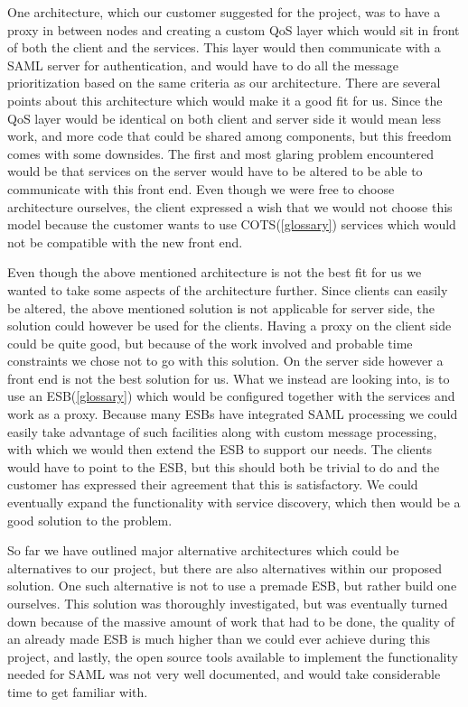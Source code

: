 \documentclass[12pt]{article}
\begin{document}
        One architecture, which our customer suggested for the project, was to have a proxy in between nodes and creating a custom QoS layer which would sit in front of both the client and the services. This layer would then communicate with a SAML server for authentication, and would have to do all the message prioritization based on the same criteria as our architecture. There are several points about this architecture which would make it a good fit for us. Since the QoS layer would be identical on both client and server side it would mean less work, and more code that could be shared among components, but this freedom comes with some downsides. The first and most glaring problem encountered would be that services on the server would have to be altered to be able to communicate with this front end. Even though we were free to choose architecture ourselves, the client expressed a wish that we would not choose this model because the customer wants to use COTS(\ref{glossary}) services which would not be compatible with the new front end.

        Even though the above mentioned architecture is not the best fit for us we wanted to take some aspects of the architecture further. Since clients can easily be altered, the above mentioned solution is not applicable for server side, the solution could however be used for the clients. Having a proxy on the client side could be quite good, but because of the work involved and probable time constraints we chose not to go with this solution. On the server side however a front end is not the best solution for us. What we instead are looking into, is to use an ESB(\ref{glossary}) which would be configured together with the services and work as a proxy. Because many ESBs have integrated SAML processing we could easily take advantage of such facilities along with custom message processing, with which we would then extend the ESB to support our needs. The clients would have to point to the ESB, but this should both be trivial to do and the customer has expressed their agreement that this is satisfactory. We could eventually expand the functionality with service discovery, which then would be a good solution to the problem.

        So far we have outlined major alternative architectures which could be alternatives to our project, but there are also alternatives within our proposed solution. One such alternative is not to use a premade ESB, but rather build one ourselves. This solution was thoroughly investigated, but was eventually turned down because of the massive amount of work that had to be done, the quality of an already made ESB is much higher than we could ever achieve during this project, and lastly, the open source tools available to implement the functionality needed for SAML was not very well documented, and would take considerable time to get familiar with.
\end{document}
